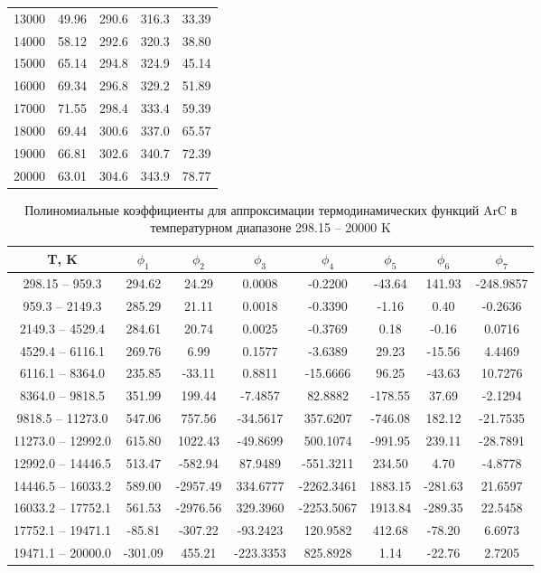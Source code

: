 \documentclass[12pt]{extarticle}
\begin{document}
\begin{table}[H]
\begin{tabular}{|c|c|c|c|c|}
    		13000  & 49.96 & 290.6 & 316.3 & 33.39 \\
    		14000  & 58.12 & 292.6 & 320.3 & 38.80 \\
    		15000  & 65.14 & 294.8 & 324.9 & 45.14 \\
    		16000  & 69.34 & 296.8 & 329.2 & 51.89 \\
    		17000  & 71.55 & 298.4 & 333.4 & 59.39 \\
    		18000  & 69.44 & 300.6 & 337.0 & 65.57 \\
    		19000  & 66.81 & 302.6 & 340.7 & 72.39 \\
    		20000  & 63.01 & 304.6 & 343.9 & 78.77 \\ \hline
    	\end{tabular}
    \end{table}
    
	\begin{table}[H]
		\centering
		\caption{\label{tab:thermo_polynom2} Полиномиальные коэффициенты для аппроксимации термодинамических функций ArC в температурном диапазоне 298.15 -- 20000 K}
		\begin{tabular}{|c|c|c|c|c|c|c|c|}
			\hline
			T, K & $\phi_1$ & $\phi_2$ & $\phi_3$ & $\phi_4$ & $\phi_5$ & $\phi_6$ & $\phi_7$ \\ \hline
			298.15 -- 959.3 & 294.62 & 24.29 & 0.0008 & -0.2200 & -43.64 & 141.93 & -248.9857 \\
			959.3 -- 2149.3 & 285.29 & 21.11 & 0.0018 & -0.3390 & -1.16 & 0.40 & -0.2636 \\
			2149.3 -- 4529.4 & 284.61 & 20.74 & 0.0025 & -0.3769 & 0.18 & -0.16 & 0.0716 \\
			4529.4 -- 6116.1 & 269.76 & 6.99 & 0.1577 & -3.6389 & 29.23 & -15.56 & 4.4469 \\
			6116.1 -- 8364.0 & 235.85 & -33.11 & 0.8811 & -15.6666 & 96.25 & -43.63 & 10.7276 \\
			8364.0 -- 9818.5 & 351.99 & 199.44 & -7.4857 & 82.8882 & -178.55 & 37.69 & -2.1294 \\
			9818.5 -- 11273.0 & 547.06 & 757.56 & -34.5617 & 357.6207 & -746.08 & 182.12 & -21.7535 \\
			11273.0 -- 12992.0 & 615.80 & 1022.43 & -49.8699 & 500.1074 & -991.95 & 239.11 & -28.7891 \\
			12992.0 -- 14446.5 & 513.47 & -582.94 & 87.9489 & -551.3211 & 234.50 & 4.70 & -4.8778 \\
			14446.5 -- 16033.2 & 589.00 & -2957.49 & 334.6777 & -2262.3461 & 1883.15 & -281.63 & 21.6597 \\
			16033.2 -- 17752.1 & 561.53 & -2976.56 & 329.3960 & -2253.5067 & 1913.84 & -289.35 & 22.5458 \\
			17752.1 -- 19471.1 & -85.81 & -307.22 & -93.2423 & 120.9582 & 412.68 & -78.20 & 6.6973 \\
			19471.1 -- 20000.0 & -301.09 & 455.21 & -223.3353 & 825.8928 & 1.14 & -22.76 & 2.7205 \\ \hline
		\end{tabular}
	\end{table}
    
\end{document}

